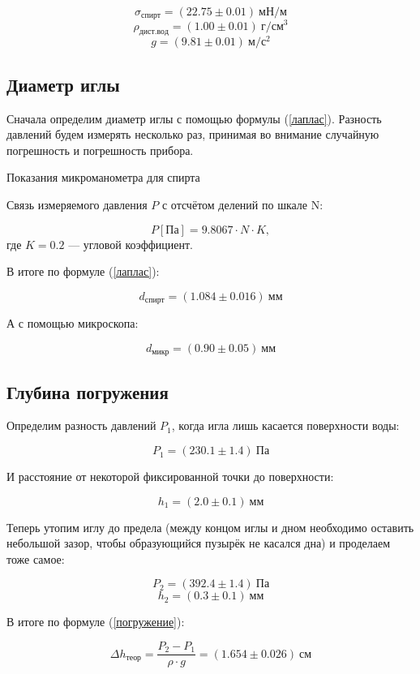 \documentclass[a4paper,12pt]{article} %
\begin{document}
$$\sigma_{спирт} = (22.75 \pm 0.01) \ мН/м$$
$$\rho_{дист.вод} = (1.00 \pm 0.01) \ г/см^3$$
$$g = (9.81 \pm 0.01) \ м/с^2$$

\subsection*{Диаметр иглы}

Сначала определим диаметр иглы с помощью формулы (\ref{лаплас}). Разность давлений будем измерять несколько раз, принимая во внимание случайную погрешность и погрешность прибора.

\begin{table}[ht!]
	\centering
	
	\caption{Показания микроманометра для спирта}
\end{table}

Связь измеряемого давления $P$ с отсчётом делений по шкале N:

$$P[Па] = 9.8067 \cdot N \cdot K,$$
где $K = 0.2$ — угловой коэффициент.

В итоге по формуле (\ref{лаплас}):

\begin{equation}\label{d_спирт}
	d_{спирт} = (1.084 \pm 0.016) \ мм
\end{equation}

А с помощью микроскопа:

\begin{equation}\label{d_микр}
	d_{микр} = (0.90 \pm 0.05) \ мм
\end{equation}

\subsection*{Глубина погружения}

Определим разность давлений $P_1$, когда игла лишь касается поверхности воды:

$$P_1 = (230.1 \pm 1.4) \ Па$$

И расстояние от некоторой фиксированной точки до поверхности:

$$h_1 = (2.0 \pm 0.1) \ мм$$

Теперь утопим иглу до предела (между концом иглы и дном необходимо оставить небольшой зазор, чтобы образующийся пузырёк не касался дна) и проделаем тоже самое:

$$P_2 = (392.4 \pm 1.4) \ Па$$
$$h_2 = (0.3 \pm 0.1) \ мм$$

В итоге по формуле (\ref{погружение}):

\begin{equation}\label{h_теор}
	\Delta h_{теор} = \dfrac{P_2 - P_1}{\rho \cdot g} = (1.654 \pm 0.026) \ см
\end{equation}
\end{document}
